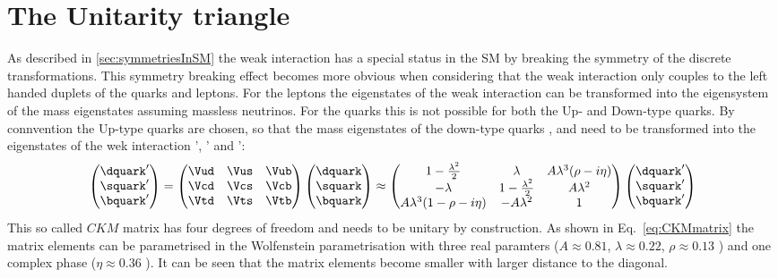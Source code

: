 \section{The Unitarity triangle}
\label{sec:unitarityTriangle}

As described in \cref{sec:symmetriesInSM} the weak interaction has a special status in the \ac{SM} by breaking the symmetry of the discrete
transformations. This symmetry breaking effect becomes more obvious when considering that the weak interaction only couples to the left handed
duplets of the quarks and leptons. For the leptons the eigenstates of the weak interaction can be transformed into the eigensystem of the mass
eigenstates assuming massless neutrinos. For the quarks this is not possible for both the Up- and Down-type quarks. By connvention the Up-type
quarks are chosen, so that the mass eigenstates of the down-type quarks \dquark, \squark and \bquark need to be transformed into the eigenstates
of the wek interaction \dquark', \squark' and \bquark':
\begin{equation}
\begin{pmatrix} \dquark' \\ \squark' \\ \bquark' \end{pmatrix}
= \begin{pmatrix} \Vud & \Vus & \Vub \\ \Vcd & \Vcs & \Vcb \\ \Vtd & \Vts & \Vtb \end{pmatrix}
\begin{pmatrix} \dquark \\ \squark \\ \bquark \end{pmatrix}
\approx \begin{pmatrix} 1-\frac{\lambda^2}{2} & \lambda & A\lambda^3(\rho-i\eta) \\
                        -\lambda & 1-\frac{\lambda^2}{2} & A\lambda^2 \\
                        A\lambda^3(1-\rho-i\eta) & -A\lambda^2 & 1 \end{pmatrix}
\begin{pmatrix} \dquark' \\ \squark' \\ \bquark' \end{pmatrix} \label{eq:CKMmatrix}
\end{equation}
This so called $CKM$ matrix has four degrees of freedom and needs to be unitary by construction. As shown in Eq.~\cref{eq:CKMmatrix} the matrix
elements can be parametrised in the Wolfenstein parametrisation with three real paramters ($A\approx0.81$, $\lambda\approx0.22$,
$\rho\approx0.13$ \cite{PDG_2017}) and one complex phase ($\eta\approx0.36$ \cite{PDG_2017}). It can be seen that the matrix elements become
smaller with larger distance to the diagonal.

